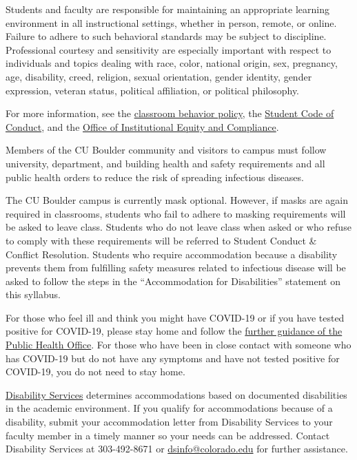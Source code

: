 \item[Classroom Behavior:] 
Students and faculty are responsible for maintaining an appropriate learning environment in all instructional settings, whether in person, remote, or online. 
Failure to adhere to such behavioral standards may be subject to discipline. 
Professional courtesy and sensitivity are especially important with respect to individuals and topics dealing with race, color, national origin, sex, pregnancy, age, disability, creed, religion, sexual orientation, gender identity, gender expression, veteran status, political affiliation, or political philosophy.
  
For more information, see the \href{http://www.colorado.edu/policies/student-classroom-and-course-related-behavior}{classroom behavior policy}, the \href{https://www.colorado.edu/sccr/student-conduct}{Student Code of Conduct}, and the \href{https://www.colorado.edu/oiec/}{Office of Institutional Equity and Compliance}. 

\item[Requirements for Infectious Diseases:]
Members of the CU Boulder community and visitors to campus must follow university, department, and building health and safety requirements and all public health orders to reduce the risk of spreading infectious diseases.
 
The CU Boulder campus is currently mask optional. 
However, if masks are again required in classrooms, students who fail to adhere to masking requirements will be asked to leave class. 
Students who do not leave class when asked or who refuse to comply with these requirements will be referred to Student Conduct \& Conflict Resolution. 
Students who require accommodation because a disability prevents them from fulfilling safety measures related to infectious disease will be asked to follow the steps in the ``Accommodation for Disabilities'' statement on this syllabus.

For those who feel ill and think you might have COVID-19 or if you have tested positive for COVID-19, please stay home and follow the \href{https://www.colorado.edu/healthcenter/coronavirus-updates/symptoms-and-what-do-if-you-feel-sick}{further guidance of the Public Health Office}. 
For those who have been in close contact with someone who has COVID-19 but do not have any symptoms and have not tested positive for COVID-19, you do not need to stay home. 

\item[Accommodation for Disabilities, Temporary Medical Conditions, and Medical Isolation:] 
\href{https://www.colorado.edu/disabilityservices/}{Disability Services} determines accommodations based on documented disabilities in the academic environment. 
If you qualify for accommodations because of a disability, submit your accommodation letter from Disability Services to your faculty member in a timely manner so your needs can be addressed. 
Contact Disability Services at 303-492-8671 or \href{mailto:dsinfo@colorado.edu}{dsinfo@colorado.edu} for further assistance.
  
